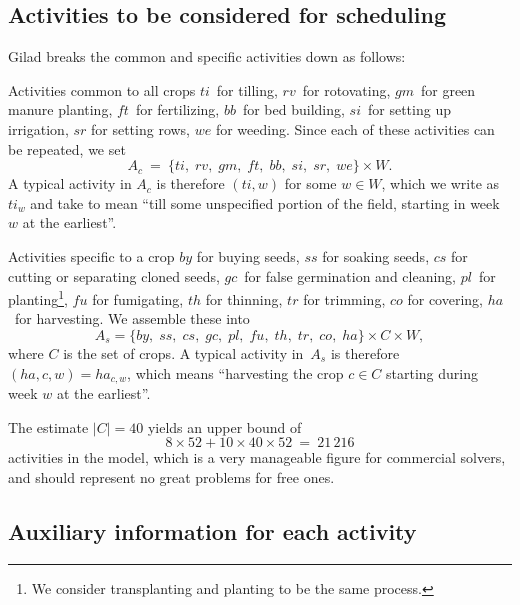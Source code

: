\documentclass[11pt,reqno]{amsart}
\numberwithin{equation}{section}
\begin{document}
\subsection{Activities to be considered for scheduling}

Gilad breaks the common and specific activities down as follows:

\begin{mydesc}
\item[Activities common to all crops] $ti$~for tilling, $rv$~for rotovating, $gm$~for
  green manure planting, $f\!t$~for fertilizing, $bb$~for bed building, $si$~for setting
  up irrigation, $sr$ for setting rows, $we$ for weeding. Since each of these activities
  can be repeated, we set
  \[
     A_c 
     \ = \
     \{ ti,\;rv,\;gm,\;f\!t,\;bb,\;si,\;sr,\;we\} \times W.
  \]
  A typical activity in $A_c$ is therefore $(ti,w)$ for some $w\in W$, which we
  write as $ti_{w}$ and take to mean ``till some unspecified portion of the field,
  starting in week $w$ at the earliest''.


\item[Activities specific to a crop] $by$ for buying seeds, $ss$ for soaking seeds, $cs$
  for cutting or separating cloned seeds, $gc$~for false germination and cleaning,
  $pl$~for planting\footnote{We consider transplanting and planting to be the same
    process.}, $f\!u$ for fumigating, $th$ for thinning, $tr$ for
  trimming, $co$ for covering, $ha$~for harvesting. We assemble these into
  \[
     A_s = \{ by,\;ss,\;cs,\;gc,\;pl,\;f\!u,\;th,\;tr,\;co,\;ha\} \times C\times W,
  \]
  where $C$ is the set of crops. A typical activity in~$A_s$ is
  therefore $(ha,c, w)=ha_{c, w}$, which means ``harvesting the crop
  $c\in C$ starting during week $w$ at the earliest''.
\end{mydesc}

The estimate $|C|=40$ yields an upper bound of
\[
    8\times 52 + 10\times 40 \times 52
    \ = \
    21\,216
\]
activities in the model, which is a very manageable figure for
commercial solvers, and should represent no great problems for free
ones.

\subsection{Auxiliary information for each activity}
\end{document}
